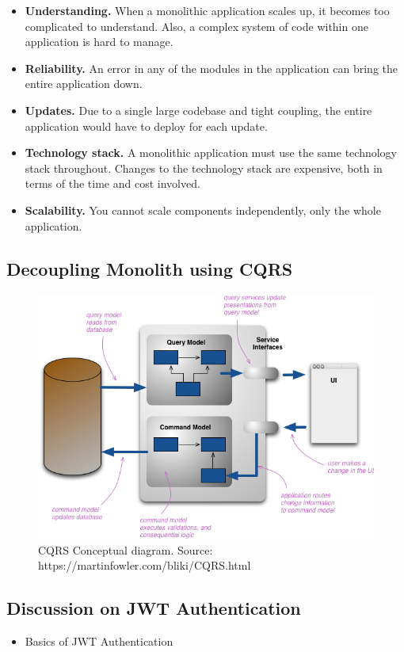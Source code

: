 \begin{itemize}
    \item \textbf{Understanding.} When a monolithic application scales up, it becomes too complicated to understand.
    Also, a complex system of code within one application is hard to manage.
    \item \textbf{Reliability.} An error in any of the modules in the application can bring the entire application down.
    \item \textbf{Updates.} Due to a single large codebase and tight coupling, the entire application would have to deploy
    for each update.
    \item \textbf{Technology stack.} A monolithic application must use the same technology stack throughout.
    Changes to the technology stack are expensive, both in terms of the time and cost involved.
    \item \textbf{Scalability.} You cannot scale components independently, only the whole application.
\end{itemize}

\subsection{Decoupling Monolith using CQRS}\label{subsec:decoupling-monolith-using-cqrs}
\begin{figure}[H]
    \centering
    \includegraphics[width=1\textwidth]{cqrs}
    \caption{CQRS Conceptual diagram. Source: https://martinfowler.com/bliki/CQRS.html}\label{fig:figure}
\end{figure}

\subsection{Discussion on JWT Authentication}\label{subsec:discussion-on-jwt-authentication}
\begin{itemize}
    \item Basics of JWT Authentication
\end{itemize}

